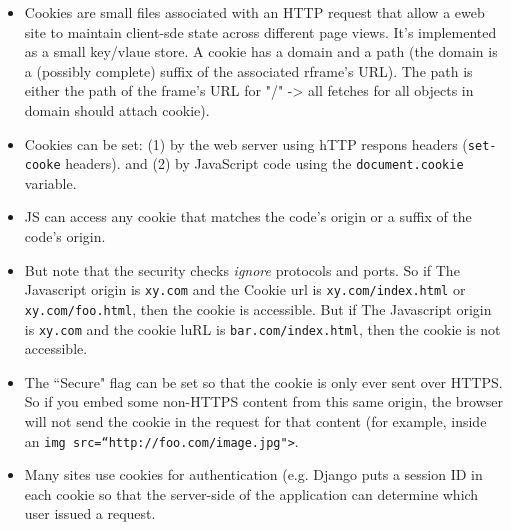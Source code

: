 \documentclass[12pt]{article}
\theoremstyle{definition}
\begin{document}
\begin{itemize}
    \itemsep0em 
	\item  Cookies are small files associated with an HTTP request that allow a eweb site to maintain client-sde state across different page views. It's implemented as a small key/vlaue store. A cookie has a domain and a path (the domain is a (possibly complete) suffix of the associated rframe's URL). The path is either the path of the frame's URL for "/" -> all fetches for all objects in domain should attach cookie).
    \item Cookies can be set: (1) by the web server using hTTP respons headers (\texttt{set-cooke} headers). and (2) by JavaScript code using the \texttt{document.cookie} variable.
    \item JS can access any cookie that matches the code's origin or a suffix of the code's origin.
    \item But note that the security checks \textit{ignore} protocols and ports. So if The Javascript origin is \texttt{xy.com} and the Cookie url is \texttt{xy.com/index.html} or \texttt{xy.com/foo.html}, then the cookie is accessible. But if The Javascript origin is \texttt{xy.com} and the cookie luRL is \texttt{bar.com/index.html}, then the cookie is not accessible.
    \item The ``Secure" flag can be set so that the cookie is only ever sent over HTTPS. So if you embed some non-HTTPS content from this same origin, the browser will not send the cookie in the request for that content (for example, inside an \texttt{img src=``http://foo.com/image.jpg">}.
    \item Many sites use cookies for authentication (e.g. Django puts a session ID in each cookie so that the server-side of the application can determine which user issued a request.
\end{itemize}
\end{document}
